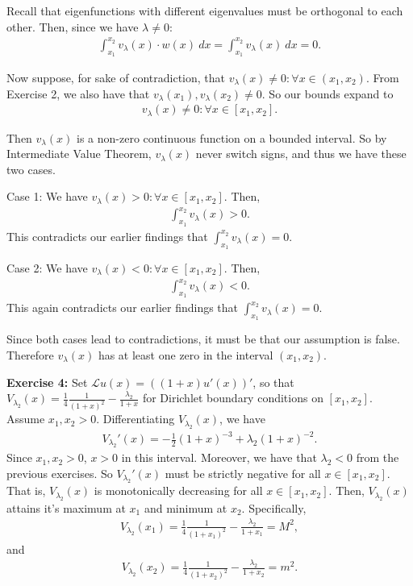 \documentclass[12pt]{article}
\begin{document}
Recall that eigenfunctions with different eigenvalues must be orthogonal to each other.
Then, since we have $\lambda \neq 0$:
\begin{align*}
    \int^{x_2}_{x_1} v_\lambda(x) \cdot w(x) ~ dx = \int^{x_2}_{x_1} v_\lambda(x) ~ dx = 0.
\end{align*}

Now suppose, for sake of contradiction, that $v_\lambda(x) \neq 0 : \forall x \in (x_1, x_2)$.
From Exercise 2, we also have that $v_\lambda(x_1), v_\lambda(x_2) \neq 0$. So our bounds expand to
\begin{align*}
    v_\lambda(x) \neq 0 : \forall x \in [x_1, x_2].
\end{align*}

Then $v_\lambda(x)$ is a non-zero continuous function on a bounded interval.
So by Intermediate Value Theorem, $v_\lambda(x)$ never switch signs, and thus we have these two cases.

Case 1:
We have $v_\lambda(x) > 0 : \forall x \in [x_1, x_2]$. Then,
\begin{align*}
    \int^{x_2}_{x_1} v_\lambda(x) > 0.
\end{align*}
This contradicts our earlier findings that $\int^{x_2}_{x_1} v_\lambda(x) = 0$.

Case 2:
We have $v_\lambda(x) < 0 : \forall x \in [x_1, x_2]$. Then,
\begin{align*}
    \int^{x_2}_{x_1} v_\lambda(x) < 0.
\end{align*}
This again contradicts our earlier findings that $\int^{x_2}_{x_1} v_\lambda(x) = 0$.

Since both cases lead to contradictions, it must be that our assumption is false.
Therefore $v_\lambda(x)$ has at least one zero in the interval $(x_1, x_2)$.

\vspace{5ex}

\noindent{}\textbf{Exercise 4:}
Set $\mathcal{L}u(x) = ((1 + x)u'(x))'$, so that $V_{\lambda_{2}}(x) = \frac{1}{4}\frac{1}{(1+x)^2} - \frac{\lambda_2}{1+x}$ for Dirichlet boundary
conditions on $[x_1, x_2]$. Assume $x_1, x_2 > 0$. Differentiating $V_{\lambda_{2}}(x)$, we have
\begin{align*}
    V_{\lambda_{2}}'(x) = -\frac{1}{2}(1+x)^{-3} + \lambda_2 (1+x)^{-2}.
\end{align*}
Since $x_1,x_2 > 0$, $x>0$ in this interval. Moreover, we have that $\lambda_2 < 0$ from the previous exercises.
So $V_{\lambda_{2}}'(x)$ must be strictly negative for all $x \in [x_1, x_2]$.
That is, $V_{\lambda_{2}}(x)$ is monotonically decreasing for all $x \in [x_1, x_2]$.
Then, $V_{\lambda_{2}}(x)$ attains it's maximum at $x_1$ and minimum at $x_2$.
Specifically,
\begin{align*}
    V_{\lambda_{2}}(x_1) = \frac{1}{4}\frac{1}{(1+x_1)^2} - \frac{\lambda_2}{1+x_1} = M^2,
\end{align*}
and
\begin{align*}
    V_{\lambda_{2}}(x_2) = \frac{1}{4}\frac{1}{(1+x_2)^2} - \frac{\lambda_2}{1+x_2} = m^2.
\end{align*}
\end{document}
